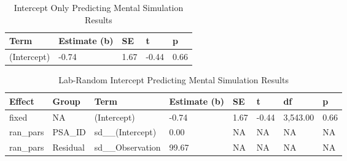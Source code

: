 \documentclass[
  man,floatsintext]{apa7}
\begin{document}
\begin{table}[tbp]

\begin{center}
\begin{threeparttable}

\caption{\label{tab:pred_intercept}Intercept Only Predicting Mental Simulation Results}

\begin{tabular}{lllll}
\toprule
Term & Estimate (b) & SE & t & p\\
\midrule
(Intercept) & -0.74 & 1.67 & -0.44 & 0.66\\
\bottomrule
\end{tabular}

\end{threeparttable}
\end{center}

\end{table}

\begin{table}[tbp]

\begin{center}
\begin{threeparttable}

\caption{\label{tab:pred_lab}Lab-Random Intercept Predicting Mental Simulation Results}

\begin{tabular}{llllllll}
\toprule
Effect & Group & Term & Estimate (b) & SE & t & df & p\\
\midrule
fixed & NA & (Intercept) & -0.74 & 1.67 & -0.44 & 3,543.00 & 0.66\\
ran\_pars & PSA\_ID & sd\_\_(Intercept) & 0.00 & NA & NA & NA & NA\\
ran\_pars & Residual & sd\_\_Observation & 99.67 & NA & NA & NA & NA\\
\bottomrule
\end{tabular}

\end{threeparttable}
\end{center}

\end{table}
\end{document}

